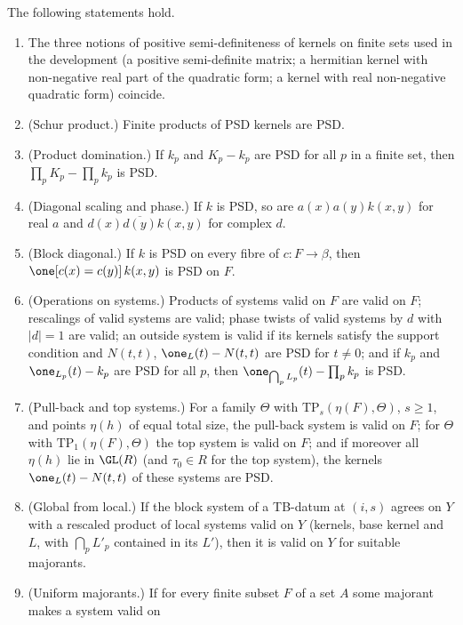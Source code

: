 \begin{theorem}\label{pf:thmS:localcores}
The following statements hold.
\begin{enumerate}[label=(LI\arabic*)]
\item\label{pf:thmS:LI1} The three notions of positive semi-definiteness of kernels on finite sets used in the development (a
positive semi-definite matrix; a hermitian kernel with non-negative real part of the quadratic form; a kernel with real
non-negative quadratic form) coincide.
\item\label{pf:thmS:LI2} (Schur product.) Finite products of PSD kernels are PSD.
\item\label{pf:thmS:LI3} (Product domination.) If $k_p$ and $K_p-k_p$ are PSD for all $p$ in a finite set, then
$\prod_pK_p-\prod_pk_p$ is PSD.
\item\label{pf:thmS:LI4} (Diagonal scaling and phase.) If $k$ is PSD, so are $a(x)a(y)k(x,y)$ for real $a$ and
$d(x)\overline{d(y)}k(x,y)$ for complex $d$.
\item\label{pf:thmS:LI5} (Block diagonal.) If $k$ is PSD on every fibre of $c\colon F\to\beta$, then $\one[c(x)=c(y)]\,k(x,y)$ is
PSD on $F$.
\item\label{pf:thmS:LI6} (Operations on systems.) Products of systems valid on $F$ are valid on $F$; rescalings of valid systems are
valid; phase twists of valid systems by $d$ with $|d|=1$ are valid; an outside system is valid if its kernels satisfy the support
condition and $N(t,t)$, $\one_L(t)-N(t,t)$ are PSD for $t\ne0$; and if $k_p$ and $\one_{L_p}(t)-k_p$ are PSD for all $p$, then
$\one_{\bigcap_pL_p}(t)-\prod_pk_p$ is PSD.
\item\label{pf:thmS:LI7} (Pull-back and top systems.) For a family $\Theta$ with $\mathrm{TP}_s(\eta(F),\Theta)$, $s\ge1$, and points
$\eta(h)$ of equal total size, the pull-back system is valid on $F$; for $\Theta$ with $\mathrm{TP}_1(\eta(F),\Theta)$ the top
system is valid on $F$; and if moreover all $\eta(h)$ lie in $\GL(R)$ (and $\tau_0\in R$ for the top system), the kernels
$\one_L(t)-N(t,t)$ of these systems are PSD.
\item\label{pf:thmS:LI8} (Global from local.) If the block system of a TB-datum at $(i,s)$ agrees on $Y$ with a rescaled product of
local systems valid on $Y$ (kernels, base kernel and $L$, with $\bigcap_pL'_p$ contained in its $L'$), then it is valid on $Y$ for
suitable majorants.
\item\label{pf:thmS:LI9} (Uniform majorants.) If for every finite subset $F$ of a set $A$ some majorant makes a system valid on

\end{enumerate}
\end{theorem}
